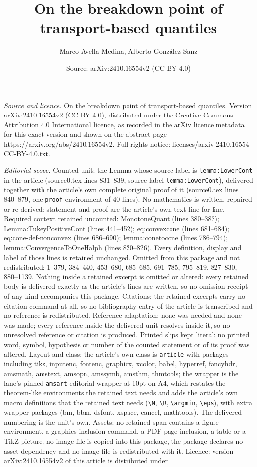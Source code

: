 \documentclass[10pt,a4paper]{amsart}
\title[On the breakdown point of transport-based quantiles]{On the breakdown point of transport-based quantiles}
\author{Marco Avella-Medina, Alberto Gonz\'alez-Sanz}
\date{Source: arXiv:2410.16554v2 (CC BY 4.0)}
\begin{document}
\maketitle

\noindent\emph{Source and licence.} On the breakdown point of transport-based quantiles. Version arXiv:2410.16554v2 (CC BY 4.0), distributed under the Creative Commons Attribution 4.0 International licence, as recorded in the arXiv licence metadata for this exact version and shown on the abstract page https://arxiv.org/abs/2410.16554v2. Full rights notice: licenses/arxiv-2410.16554-CC-BY-4.0.txt.\par\smallskip

\noindent\textit{Editorial scope.} Counted unit: the Lemma whose source label is \texttt{lemma:LowerCont} in the article (source0.tex lines 831--839, source label \texttt{lemma:LowerCont}), delivered together with the article's own complete original proof of it (source0.tex lines 840--879, one \texttt{proof} environment of 40 lines). No mathematics is written, repaired or re-derived: statement and proof are the article's own text line for line. Required context retained uncounted: MonotoneQuant (lines 380--383); Lemma:TukeyPositiveCont (lines 441--452); eq:convexcone (lines 681--684); eq:cone-def-nonconvex (lines 686--690); lemma:conetocone (lines 786--794); lemma:ConvergenceToOneHalph (lines 820--826). Every definition, display and label of those lines is retained unchanged. Omitted from this package and not redistributed: 1--379, 384--440, 453--680, 685--685, 691--785, 795--819, 827--830, 880--1139. Nothing inside a retained excerpt is omitted or altered: every retained body is delivered exactly as the article's lines are written, so no omission receipt of any kind accompanies this package. Citations: the retained excerpts carry no citation command at all, so no bibliography entry of the article is transcribed and no reference is redistributed. Reference adaptation: none was needed and none was made; every reference inside the delivered unit resolves inside it, so no unresolved reference or citation is produced. Printed slips kept literal: no printed word, symbol, hypothesis or number of the counted statement or of its proof was altered. Layout and class: the article's own class is \texttt{article} with packages including tikz, inputenc, fontenc, graphicx, xcolor, babel, hyperref, fancyhdr, amsmath, amstext, amsopn, amssymb, amsthm, thmtools; the wrapper is the lane's pinned \texttt{amsart} editorial wrapper at 10pt on A4, which restates the theorem-like environments the retained text needs and adds the article's own macro definitions that the retained text needs (\texttt{\textbackslash N}, \texttt{\textbackslash R}, \texttt{\textbackslash argmin}, \texttt{\textbackslash eps}), with extra wrapper packages (bm, bbm, dsfont, xspace, cancel, mathtools). The delivered numbering is the unit's own. Assets: no retained span contains a figure environment, a graphics-inclusion command, a PDF-page inclusion, a table or a TikZ picture; no image file is copied into this package, the package declares no asset dependency and no image file is redistributed with it. Licence: version arXiv:2410.16554v2 of this article is distributed under 
\end{document}
